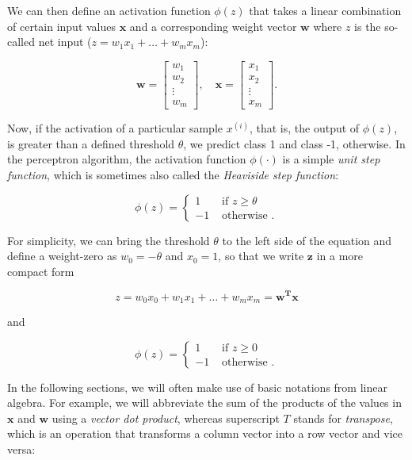 \documentclass[letterpaper]{report}
\begin{document}
We can then define an activation function $\phi(z)$ that takes a linear combination of certain
input values $\mathbf{x}$ and a corresponding weight vector $\mathbf{w}$ where $z$ is the so-called net
input ($z = w_1 x_1 + \dots + w_m x_m$):

\[
\mathbf{w} = \begin{bmatrix}
    w_{1}  \\
    w_{2}  \\
    \vdots  \\
    w_{m}
\end{bmatrix}, \quad
\mathbf{x} = \begin{bmatrix}
    x_{1}  \\
    x_{2}  \\
    \vdots  \\
    x_{m}
\end{bmatrix}.
\]

Now, if the activation of a particular sample $x^{(i)}$, that is, the output of $\phi(z)$, is greater than a defined threshold $\theta$, we predict class 1 and class -1, otherwise. In the perceptron algorithm, the activation function $\phi(\cdot)$ is a simple \textit{unit step function}, which is sometimes also called the \textit{Heaviside step function}:

\[ \phi(z) = \begin{cases} 
      1 & \text{ if } z \ge \theta \\
      -1 & \text{ otherwise }.
   \end{cases}
\]

For simplicity, we can bring the threshold $\theta$ to the left side of the equation and define a weight-zero as $w_0 = -\theta$ and $x_0=1$, so that we write $\mathbf{z}$ in a more compact form

\[
z  = w_0 x_0 + w_1 x_1 + \dots + w_m x_m = \mathbf{w^T x}
\]

and

\[ \phi(z) = \begin{cases} 
      1 & \text{ if } z \ge 0 \\
      -1 & \text{ otherwise }.
   \end{cases}
\]


In the following sections, we will often make use of basic notations from linear algebra. For example, we will abbreviate the sum of the products of the values in $\mathbf{x}$ and $\mathbf{w}$ using a \textit{vector dot product}, whereas superscript $T$ stands for \textit{transpose}, which is an operation that transforms a column vector into a row vector and vice versa:
\end{document}
